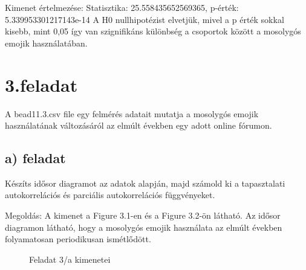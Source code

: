 \documentclass[11pt,a4paper,oneside]{report}
\begin{document}
Kimenet értelmezése:
Statisztika: 25.558435652569365, p-érték: 5.339953301217143e-14
A H0 nullhipotézist elvetjük, mivel a p érték sokkal kisebb, mint 0,05 így van szignifikáns különbség a csoportok között a mosolygós emojik használatában.

\chapter{3.feladat}
A bead11.3.csv file egy felmérés adatait mutatja a mosolygós emojik használatának változásáról az elmúlt években egy adott online fórumon.

\section{a) feladat}
Készíts idősor diagramot az adatok alapján, majd számold ki a tapasztalati autokorrelációs és parciális autokorrelációs függvényeket.

Megoldás:
A kimenet a Figure 3.1-en és a Figure 3.2-ön látható. Az idősor diagramon látható, hogy a mosolygós emojik használata az elmúlt években folyamatosan periodikusan ismétlődött.

\begin{figure}%
  \centering
  \qquad
  \caption{Feladat 3/a kimenetei}%
  \label{fig:example}%
\end{figure}
\end{document}
